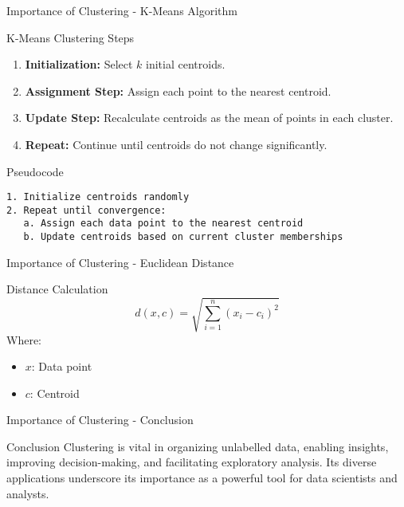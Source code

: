 \documentclass[aspectratio=169]{beamer}
\begin{document}
\begin{frame}[fragile]{Importance of Clustering - K-Means Algorithm}
    \begin{block}{K-Means Clustering Steps}
        \begin{enumerate}
            \item \textbf{Initialization:} Select $k$ initial centroids.
            \item \textbf{Assignment Step:} Assign each point to the nearest centroid.
            \item \textbf{Update Step:} Recalculate centroids as the mean of points in each cluster.
            \item \textbf{Repeat:} Continue until centroids do not change significantly.
        \end{enumerate}
    \end{block}

    \begin{block}{Pseudocode}
        \begin{lstlisting}
1. Initialize centroids randomly
2. Repeat until convergence:
   a. Assign each data point to the nearest centroid
   b. Update centroids based on current cluster memberships
        \end{lstlisting}
    \end{block}
\end{frame}

\begin{frame}[fragile]{Importance of Clustering - Euclidean Distance}
    \begin{block}{Distance Calculation}
        \begin{equation}
            d(x, c) = \sqrt{\sum_{i=1}^{n} (x_i - c_i)^2}
        \end{equation}
        Where:
        \begin{itemize}
          \item $x$: Data point
          \item $c$: Centroid
        \end{itemize}
    \end{block}
\end{frame}

\begin{frame}[fragile]{Importance of Clustering - Conclusion}
    \begin{block}{Conclusion}
        Clustering is vital in organizing unlabelled data, enabling insights, improving decision-making, and facilitating exploratory analysis. Its diverse applications underscore its importance as a powerful tool for data scientists and analysts.
    \end{block}
\end{frame}
\end{document}
